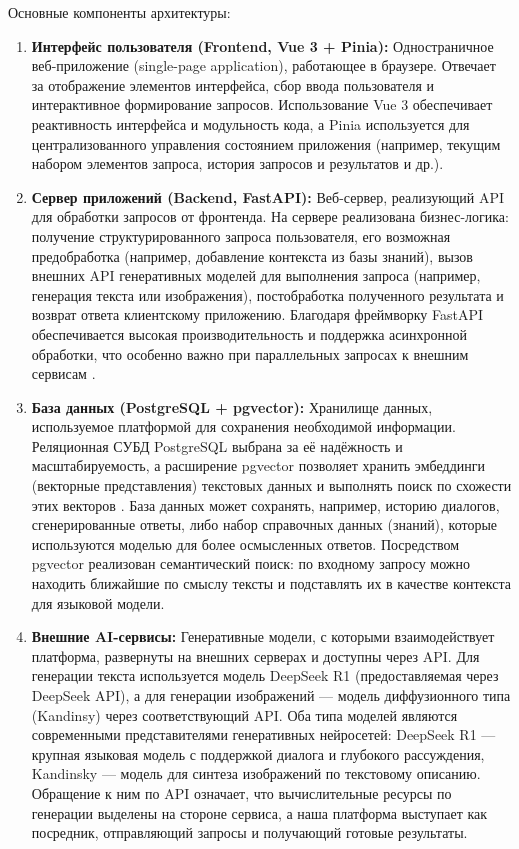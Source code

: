 Основные компоненты архитектуры:
\begin{enumerate}[label=\arabic*]
\item \textbf{Интерфейс пользователя (Frontend, Vue 3 + Pinia):} Одностраничное веб-приложение (single-page application), работающее в браузере. Отвечает за отображение элементов интерфейса, сбор ввода пользователя и интерактивное формирование запросов. Использование Vue 3 обеспечивает реактивность интерфейса и модульность кода, а Pinia используется для централизованного управления состоянием приложения (например, текущим набором элементов запроса, история запросов и результатов и др.)\cite{vuejs:wiki}.
\item \textbf{Сервер приложений (Backend, FastAPI):} Веб-сервер, реализующий API для обработки запросов от фронтенда. На сервере реализована бизнес-логика: получение структурированного запроса пользователя, его возможная предобработка (например, добавление контекста из базы знаний), вызов внешних API генеративных моделей для выполнения запроса (например, генерация текста или изображения), постобработка полученного результата и возврат ответа клиентскому приложению. Благодаря фреймворку FastAPI обеспечивается высокая производительность и поддержка асинхронной обработки, что особенно важно при параллельных запросах к внешним сервисам \cite{yandex:fastapi}.
\item \textbf{База данных (PostgreSQL + pgvector):} Хранилище данных, используемое платформой для сохранения необходимой информации. Реляционная СУБД PostgreSQL выбрана за её надёжность и масштабируемость, а расширение pgvector позволяет хранить эмбеддинги (векторные представления) текстовых данных и выполнять поиск по схожести этих векторов \cite{postgresql:wiki}. База данных может сохранять, например, историю диалогов, сгенерированные ответы, либо набор справочных данных (знаний), которые используются моделью для более осмысленных ответов. Посредством pgvector реализован семантический поиск: по входному запросу можно находить ближайшие по смыслу тексты и подставлять их в качестве контекста для языковой модели.
\item \textbf{Внешние AI-сервисы:} Генеративные модели, с которыми взаимодействует платформа, развернуты на внешних серверах и доступны через API. Для генерации текста используется модель DeepSeek R1 (предоставляемая через DeepSeek API)\cite{deepseek:docs}, а для генерации изображений --- модель диффузионного типа (Kandinsy) через соответствующий API\cite{sitelabs:kandinsky}. Оба типа моделей являются современными представителями генеративных нейросетей: DeepSeek R1 — крупная языковая модель с поддержкой диалога и глубокого рассуждения, Kandinsky — модель для синтеза изображений по текстовому описанию. Обращение к ним по API означает, что вычислительные ресурсы по генерации выделены на стороне сервиса, а наша платформа выступает как посредник, отправляющий запросы и получающий готовые результаты.
\end{enumerate}


